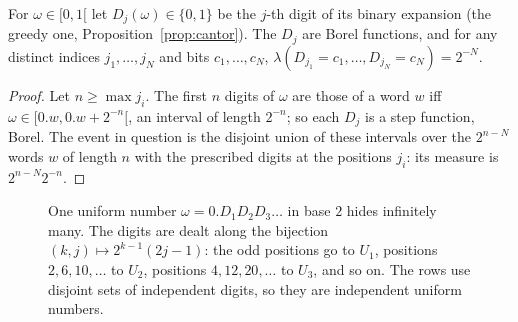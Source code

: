 \begin{lemma}\label{lem:digits6}
For $\omega\in[0,1[$ let $D_j(\omega)\in\{0,1\}$ be the $j$-th digit of its binary expansion (the greedy one, Proposition~\ref{prop:cantor}). The $D_j$ are Borel functions, and for any distinct
indices $j_1,\dots,j_N$ and bits $c_1,\dots,c_N$, $\lambda(D_{j_1}=c_1,\dots,D_{j_N}=c_N)=2^{-N}$.
\end{lemma}
\begin{proof}
Let $n\ge\max j_i$. The first $n$ digits of $\omega$ are those of a word $w$ iff $\omega\in[0.w,0.w+2^{-n}[$, an interval of length $2^{-n}$; so each $D_j$ is a step function, Borel. The event in
question is the disjoint union of these intervals over the $2^{n-N}$ words $w$ of length $n$ with the prescribed digits at the positions $j_i$: its measure is $2^{n-N}2^{-n}$.
\end{proof}

\begin{figure}[ht]
\centering
{}
\caption{One uniform number $\omega=0.D_1D_2D_3\ldots$ in base $2$ hides infinitely many. The digits are dealt along the bijection $(k,j)\mapsto2^{k-1}(2j-1)$: the odd positions go to
$U_1$, positions $2,6,10,\ldots$ to $U_2$, positions $4,12,20,\ldots$ to $U_3$, and so on. The rows use disjoint sets of independent digits, so they are independent uniform
numbers.}
\label{fig:digits}
\end{figure}

